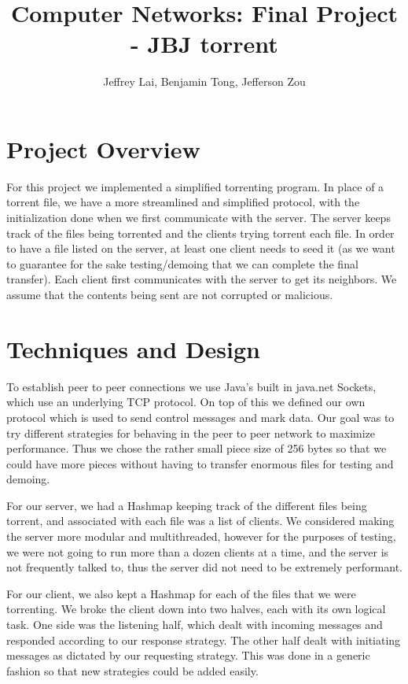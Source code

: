 \documentclass[12pt]{article}
\newcommand{\ClassName}{Computer Networks}
\begin{document}
\title{\ClassName: Final Project - JBJ torrent}
\author{Jeffrey Lai, Benjamin Tong, Jefferson Zou}

\maketitle
\thispagestyle{empty}
\section{Project Overview}
For this project we implemented a simplified torrenting program. In place of a torrent file, we have a more streamlined and simplified protocol, with the initialization done when we first communicate with the server. The server keeps track of the files being torrented and the clients trying torrent each file. In order to have a file listed on the server, at least one client needs to seed it (as we want to guarantee for the sake testing/demoing that we can complete the final transfer). Each client first communicates with the server to get its neighbors. We assume that the contents being sent are not corrupted or malicious. 
\section{Techniques and Design}
To establish peer to peer connections we use Java's built in java.net Sockets, which use an underlying TCP protocol. On top of this we defined our own protocol which is used to send control messages and mark data. Our goal was to try different strategies for behaving in the peer to peer network to maximize performance. Thus we chose the rather small piece size of 256 bytes so that we could have more pieces without having to transfer enormous files for testing and demoing. 

For our server, we had a Hashmap keeping track of the different files being torrent, and associated with each file was a list of clients. We considered making the server more modular and multithreaded, however for the purposes of testing, we were not going to run more than a dozen clients at a time, and the server is not frequently talked to, thus the server did not need to be extremely performant. 

For our client, we also kept a Hashmap for each of the files that we were torrenting. We broke the client down into two halves, each with its own logical task. One side was the listening half, which dealt with incoming messages and responded according to our response strategy. The other half dealt with initiating messages as dictated by our requesting strategy. This was done in a generic fashion so that new strategies could be added easily. 
\end{document}
